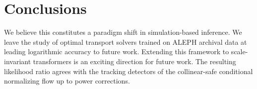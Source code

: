 \section{Conclusions}\label{sec:conclusions}

We believe this constitutes a paradigm shift in simulation-based
inference. We leave the study of optimal transport solvers trained on
ALEPH archival data at leading logarithmic accuracy to future work.
Extending this framework to scale-invariant transformers is an exciting
direction for future work. The resulting likelihood ratio agrees with
the tracking detectors of the collinear-safe conditional normalizing
flow up to power corrections.


